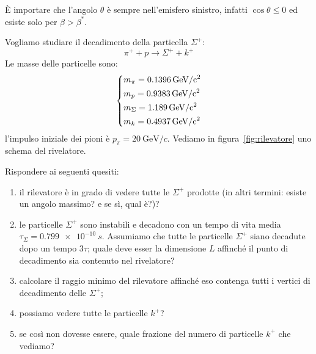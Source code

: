 \begin{note}[]
  È importare che l'angolo $\theta$ è sempre nell'emisfero sinistro, infatti
  $\cos \theta \leq 0$ ed esiste solo per $\beta > \beta ^{\ast}$.
\end{note}

\begin{example}
  Vogliamo studiare il decadimento della particella $\Sigma^+$:
  \begin{equation}
    \pi^+ + p \rightarrow \Sigma^+ + k^+
  \end{equation}
  Le masse delle particelle sono:
  \begin{equation}
    \begin{dcases}
      m _{\pi} = \SI{0.1396}{\GeV \per c^2}
      \\
      m _{p} = \SI{0.9383}{\GeV \per c^2}
      \\
      m _{\Sigma} = \SI{1.189}{\GeV \per c^2}
      \\
      m _{k} = \SI{0.4937}{\GeV \per c^2}
    \end{dcases}
  \end{equation}
  l'impulso iniziale dei pioni è $p _{\pi} = \SI{20}{\GeV \per c}$. Vediamo in
  figura~\ref{fig:rilevatore} uno schema del rivelatore.

  Rispondere ai seguenti quesiti:
  \begin{enumerate}
    \item il rilevatore è in grado di vedere tutte le $\Sigma^+$ prodotte (in
      altri termini: esiste un angolo massimo? e se sì, qual è?)?
    \item le particelle $\Sigma^+$ sono instabili e decadono con un tempo di
      vita media $\tau_\Sigma = \SI{0.799e-10}{s}$. Assumiamo che tutte le
      particelle $\Sigma^+$ siano decadute dopo un tempo $3 \tau$; quale deve
      esser la dimensione $L$ affinché il punto di decadimento sia contenuto
      nel rivelatore?
    \item calcolare il raggio minimo del rilevatore affinché eso contenga tutti
      i vertici di decadimento delle $\Sigma^+$;
    \item possiamo vedere tutte le particelle $k^+$?
    \item se così non dovesse essere, quale frazione del numero di particelle
      $k^+$ che vediamo?
  \end{enumerate}


\end{example}
